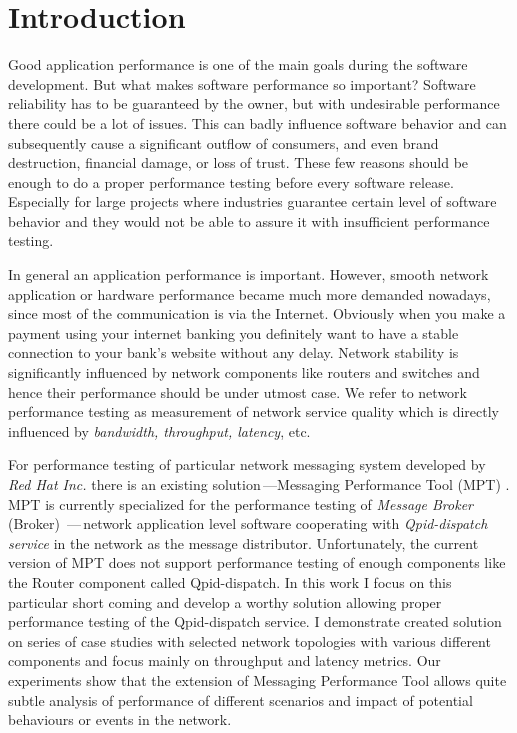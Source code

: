 \documentclass{ExcelAtFIT}
\affiliation{*%
  \href{mailto:xstejs24@studfit.vutbr.cz}{xstejs24@stud.fit.vutbr.cz},
  \textit{Faculty of Information Technology, Brno University of Technology}}
\begin{document}
\startdocument



\section{Introduction}
Good application performance is one of the main goals during the software development. But what makes software performance so important? Software reliability has to be guaranteed by the owner, but with undesirable performance there could be a lot of issues. This can badly influence software behavior and can subsequently cause a significant outflow of consumers, and even brand destruction, financial damage, or loss of trust. These few reasons should be enough to do a proper performance testing before every software release. Especially for large projects where industries guarantee certain level of software behavior and they would not be able to assure it with insufficient performance testing.

In general an application performance is important. However, smooth network application or hardware performance became much more demanded nowadays, since most of the communication is via the Internet.  Obviously when you make a payment using your internet banking you definitely want to have a stable connection to your bank's website without any delay. Network stability is significantly influenced by network components like routers and switches and hence their performance should be under utmost case. We refer to network performance testing as measurement of network service quality which is directly influenced by \emph{bandwidth, throughput, latency}, etc.

For performance testing of particular network messaging system developed by \emph{Red Hat Inc.} there is an existing solution\,---Messaging Performance Tool (MPT) \cite{ORPISKE:MSGPT}. MPT is currently specialized for the performance testing of \emph{Message Broker} (Broker) \cite{RH:Broker}\,---\,network application level software cooperating with \emph{Qpid-dispatch service} \cite{RH:Interconnect} in the network as the message distributor. Unfortunately, the current version of MPT does not support performance testing of enough components like the Router component called Qpid-dispatch. In this work I focus on this particular short coming and develop a worthy solution allowing proper performance testing of the Qpid-dispatch service. I demonstrate created solution on series of case studies with selected network topologies with various different components and focus mainly on throughput and latency metrics. Our experiments show that the extension of Messaging Performance Tool allows quite subtle analysis of performance of different scenarios and impact of potential behaviours or events in the network.
\end{document}
